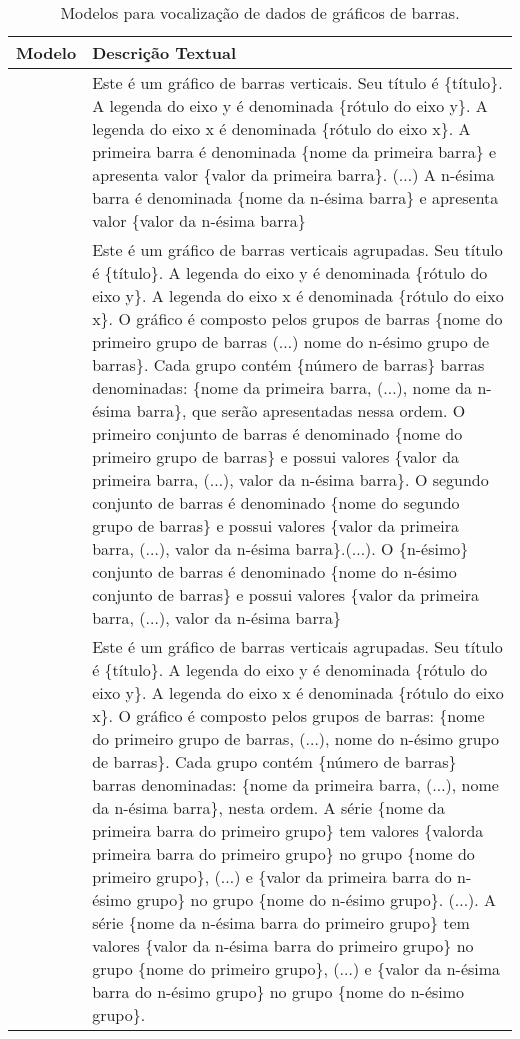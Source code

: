
\begin{table}[hbtp]

\footnotesize
\centering
\settowidth{}
\caption{Modelos para vocalização de dados de gráficos de barras.}
\label{tab:modelos}

\begin{tabulary}{1\textwidth}{|C|J|}
\hline

    \textbf{Modelo} & 
    \textbf{Descrição Textual} \\
\hline
     \vspace{0.5cm}{1} & {Este é um gráfico de barras verticais. Seu título é \{título\}. A legenda do eixo y é denominada \{rótulo do eixo y\}. A legenda do eixo x é denominada \{rótulo do eixo x\}. A primeira barra é denominada \{nome da primeira barra\} e apresenta valor \{valor da primeira barra\}. ($\ldots$) A n-ésima barra é denominada \{nome da n-ésima barra\} e apresenta valor \{valor da n-ésima barra\}}   \\ \hline 
      \vspace{1.6cm}{2} & {Este é um gráfico de barras verticais agrupadas. Seu título é \{título\}. A legenda do eixo y é denominada \{rótulo do eixo y\}. A legenda do eixo x é denominada \{rótulo do eixo x\}. O gráfico é composto pelos grupos de barras \{nome do primeiro grupo de barras ($\ldots$) nome do n-ésimo grupo de barras\}. Cada grupo contém \{número de barras\} barras denominadas: \{nome da primeira barra, ($\ldots$), nome da n-ésima barra\}, que serão apresentadas nessa ordem. O primeiro conjunto de barras é denominado \{nome do primeiro grupo de barras\} e possui valores \{valor da primeira barra, ($\ldots$), valor da n-ésima barra\}. O segundo conjunto de barras é denominado \{nome do segundo grupo de barras\} e possui valores \{valor da primeira barra, ($\ldots$), valor da n-ésima barra\}.($\ldots$). O \{n-ésimo\} conjunto de barras é denominado \{nome do n-ésimo conjunto de barras\} e possui valores \{valor da primeira barra, ($\ldots$), valor da n-ésima barra\}}  \\ \hline
     \vspace{1.55cm}{3} &{Este é um gráfico de barras verticais agrupadas. Seu título é \{título\}. A legenda do eixo y é denominada \{rótulo do eixo y\}. A legenda do eixo x é denominada \{rótulo do eixo x\}. O gráfico é composto pelos grupos de barras: \{nome do primeiro grupo de barras, ($\ldots$), nome do n-ésimo grupo de barras\}. Cada grupo contém \{número de barras\} barras denominadas: \{nome da primeira barra, ($\ldots$), nome da n-ésima barra\}, nesta ordem. A série \{nome da primeira barra do primeiro grupo\} tem valores \{valorda primeira barra do primeiro grupo\} no grupo \{nome do primeiro grupo\}, ($\ldots$) e \{valor da primeira barra do n-ésimo grupo\} no grupo \{nome do n-ésimo grupo\}. ($\ldots$). A série \{nome da n-ésima barra do primeiro grupo\} tem valores \{valor da n-ésima barra do primeiro grupo\} no grupo \{nome do primeiro grupo\}, ($\ldots$) e \{valor da n-ésima barra do n-ésimo grupo\} no grupo \{nome do n-ésimo grupo\}.}\\ \hline

\end{tabulary}
\end{table}
